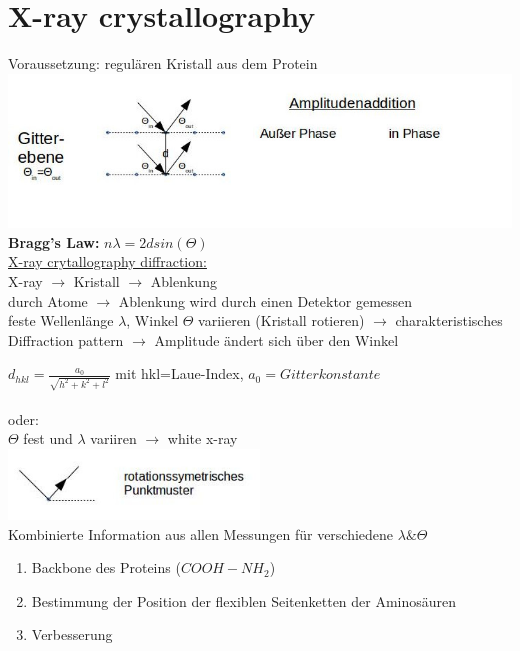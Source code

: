 \section{X-ray crystallography}
Voraussetzung: regulären Kristall aus dem Protein\\
\includegraphics[width=1\textwidth]{lectures/160603/pix/1.jpg}
\textbf{Bragg's Law:} $n\lambda=2dsin(\Theta)$\\

\underline{X-ray crytallography diffraction:}\\
X-ray $\rightarrow$ Kristall $\rightarrow$ Ablenkung\\
durch Atome $\rightarrow$ Ablenkung wird durch einen Detektor gemessen\\
feste Wellenlänge $\lambda$, Winkel $\Theta$ variieren (Kristall rotieren) $\rightarrow$ charakteristisches Diffraction pattern $\rightarrow$ Amplitude ändert sich über den Winkel

$d_{hkl}=\frac{a_{0}}{\sqrt{h^2+k^2+l^2}}$ mit hkl=Laue-Index, $a_0=Gitterkonstante$
\\\\
oder:\\
$\Theta$ fest und $\lambda$ variiren $\rightarrow$ white x-ray\\
\includegraphics[width=0.5\textwidth]{lectures/160603/pix/2.jpg}
\\
Kombinierte Information aus allen Messungen für verschiedene $\lambda \& \Theta$
\\
\begin{enumerate}
	\item Backbone des Proteins ($COOH-NH_2$)
	\item Bestimmung der Position der flexiblen Seitenketten der Aminosäuren
	\item Verbesserung
\end{enumerate}

